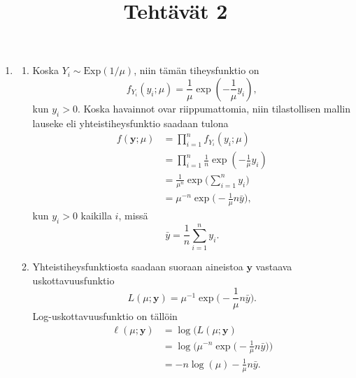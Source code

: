 \documentclass[12pt]{article}
\title{Tehtävät 2}
\begin{document}
\maketitle
\begin{enumerate}
\item[1.]
\begin{enumerate}
\item[(a)] Koska $Y_i \sim \text{Exp}(1/\mu)$, niin tämän tiheysfunktio on 
$$
f_{Y_i}(y_i; \mu) = \frac{1}{\mu} \exp(-\frac{1}{\mu} y_i),
$$
kun $y_i > 0$. Koska havainnot ovar riippumattomia, niin tilastollisen mallin lauseke eli yhteistiheysfunktio saadaan tulona
$$
\begin{aligned}
f(\textbf{y}; \mu) &= \prod_{i = 1}^n f_{Y_i}(y_i; \mu) \\
    &= \prod_{i = 1}^n \frac{1}{n} \exp(-\frac{1}{\mu} y_i) \\
    &= \frac{1}{\mu^n} \exp\Bigg( \sum_{i = 1}^n y_i \Bigg) \\
    &= \mu^{-n} \exp\Bigg( -\frac{1}{\mu}n\bar{y} \Bigg),
\end{aligned}
$$
kun $y_i > 0$ kaikilla $i$, missä 
$$
\bar{y} = \frac{1}{n} \sum_{i = 1}^n y_i.
$$
\item[(b)] Yhteistiheysfunktiosta saadaan suoraan aineistoa $\textbf{y}$ vastaava uskottavuusfunktio
$$
L(\mu; \textbf{y}) = \mu^{-1} \exp\Bigg( -\frac{1}{\mu} n \bar{y} \Bigg).
$$
Log-uskottavuusfunktio on tällöin
$$
\begin{aligned}
\ell(\mu; \textbf{y}) &= \log(L(\mu; \textbf{y}) \\
    &= \log \Bigg( \mu^{-n} \exp \bigg( -\frac{1}{\mu} n \bar{y} \bigg) \Bigg) \\
    &= -n \log(\mu) - \frac{1}{\mu} n\bar{y}.
\end{aligned}
$$


\end{enumerate}
\end{enumerate}
\end{document}
